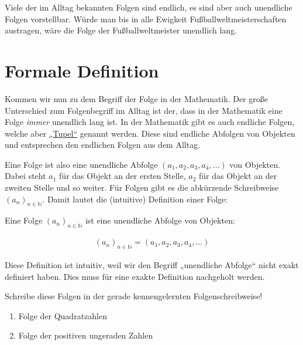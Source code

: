 \documentclass[fontsize=9pt,
               parskip=half-,
               DIV=14,
               listof=chapterentry,
               tocflat]{scrbook}
\begin{document}
Viele der im Alltag bekannten Folgen sind endlich, es sind aber auch unendliche Folgen vorstellbar. Würde man bis in alle Ewigkeit Fußballweltmeisterschaften austragen, wäre die Folge der Fußballweltmeister unendlich lang.

\section{Formale Definition}

Kommen wir nun zu dem Begriff der Folge in der Mathematik. Der große Unterschied zum Folgenbegriff im Alltag ist der, dass in der Mathematik eine Folge \emph{immer} unendlich lang ist. In der Mathematik gibt es auch endliche Folgen, welche aber \href{https://de.wikibooks.org/wiki/Mathe\_für\_Nicht-Freaks:\_Tupel\_und\_geordnetes\_Paar}
{„Tupel“} genannt werden. Diese sind endliche Abfolgen von Objekten und entsprechen den endlichen Folgen aus dem Alltag.

Eine Folge ist also eine unendliche Abfolge $(a_{1},a_{2},a_{3},a_{4},\ldots )$ von Objekten. Dabei steht $a_{1}$ für das Objekt an der ersten Stelle, $a_{2}$ für das Objekt an der zweiten Stelle und so weiter. Für Folgen gibt es die abkürzende Schreibweise $(a_{n})_{n\in \mathbb {N} }$. Damit lautet die (intuitive) Definition einer Folge:

\begin{importantparagraph*}
Eine Folge $(a_{n})_{n\in \mathbb {N} }$ ist eine unendliche Abfolge von Objekten:

\begin{align*}
(a_{n})_{n\in \mathbb {N} }=(a_{1},a_{2},a_{3},a_{4},\ldots )
\end{align*}

\end{importantparagraph*}

Diese Definition ist intuitiv, weil wir den Begriff „unendliche Abfolge“ nicht exakt definiert haben. Dies muss für eine exakte Definition nachgeholt werden.

\begin{mdframed}[style=semanticbox,frametitleaboveskip=3pt,innerbottommargin=3pt,frametitle={Verständnisaufgabe}]
Schreibe diese Folgen in der gerade kennengelernten Folgenschreibweise!

\begin{enumerate}
\item Folge der Quadratzahlen
\item Folge der positiven ungeraden Zahlen
\end{enumerate}

\end{mdframed}
\end{document}

